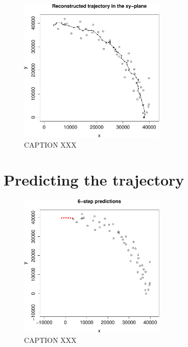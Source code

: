 \begin{figure}[ht]
    \centering
    \includegraphics[width=70mm]{../plots/reconstruction.pdf}
    \caption{CAPTION XXX}
    \label{fig:reconstruction}
\end{figure}

\section*{Predicting the trajectory}

\begin{figure}[ht]
    \centering
    \includegraphics[width=70mm]{../plots/all-predictions.pdf}
    \caption{CAPTION XXX}
    \label{fig:all-predictions}
\end{figure}

